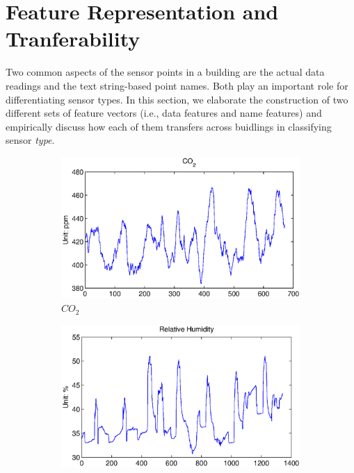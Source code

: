 \section{Feature Representation and Tranferability}
Two common aspects of the sensor points in a building are the actual data readings and the text string-based point names. Both play an important role for differentiating sensor types.
In this section, we elaborate the construction of two different sets of feature vectors (i.e., data features and name features) and empirically discuss how each of them transfers across buidlings in classifying sensor \emph{type}.

\begin{figure}[ht!]
\centering
  \begin{subfigure}{0.32\textwidth}
                \centering
    \includegraphics[width=\textwidth]{./fig/co2.eps}
                \caption{$CO_{2}$}
  \end{subfigure}
  \begin{subfigure}{0.32\textwidth}
                \centering
    \includegraphics[width=\textwidth]{./fig/rh.eps}

\end{subfigure}
\end{figure}

